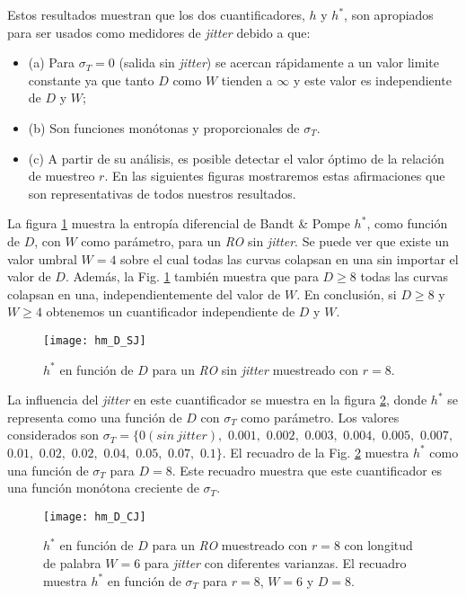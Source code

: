Estos resultados muestran que los dos cuantificadores, $h$ y $h^*$, son apropiados para ser usados como medidores de \textit{jitter} debido a que: 
\begin{itemize} 
\item (a) Para $\sigma_T=0$ (salida sin \textit{jitter}) se acercan rápidamente a un valor limite constante ya que tanto $D$ como $W$ tienden a $\infty$ y este valor es independiente de $D$ y $W$; 
\item (b) Son funciones monótonas y proporcionales de $\sigma_T$.
\item (c) A partir de su análisis, es posible detectar el valor óptimo de la relación de muestreo $r$.
En las siguientes figuras mostraremos estas afirmaciones que son representativas de todos nuestros resultados.
\end{itemize}
%
La figura \ref{fig:hm_D_SJ} muestra la entropía diferencial de Bandt \& Pompe $h^*$, como función de $D$, con $W$ como parámetro, para un \textit{RO} sin \textit{jitter}.
Se puede ver que existe un valor umbral $W = 4$ sobre el cual todas las curvas colapsan en una sin importar el valor de $D$.
Además, la Fig. \ref{fig:hm_D_SJ} también muestra que para $D \ge 8$ todas las curvas colapsan en una, independientemente del valor de $W$.
En conclusión, si $D \ge 8$ y $W \ge 4$ obtenemos un cuantificador independiente de $D$ y $W$.
%
\begin{figure}
	\centering
	\texttt{[image: hm\_D\_SJ]}
	\caption{$h^*$ en función de $D$ para un \emph{RO} sin \textit{jitter} muestreado con $r=8$.}
	\label{fig:hm_D_SJ}
\end{figure}

La influencia del \textit{jitter} en este cuantificador se muestra en la figura \ref{fig:hm_D_CJ}, donde $h^*$ se representa como una función de $D$ con $\sigma_T$ como parámetro.
Los valores considerados son $\sigma_T=\{0 (sin~jitter),$ $0.001,$ $0.002,$ $0.003,$ $0.004,$ $0.005,$ $0.007,$ $0.01,$ $0.02,$ $0.02,$ $0.04,$ $0.05,$ $0.07,$ $0.1\}$.
El recuadro de la Fig. \ref{fig:hm_D_CJ} muestra $h^*$ como una función de $\sigma_T$ para $D = 8$.
Este recuadro muestra que este cuantificador es una función monótona creciente de $\sigma_T$.
%
\begin{figure}
	\centering
	\texttt{[image: hm\_D\_CJ]}
	\caption{$h^*$ en función de $D$ para un \emph{RO} muestreado con $r=8$ con longitud de palabra $W=6$ para \textit{jitter} con diferentes varianzas. El recuadro muestra $h^*$ en función de $\sigma_T$ para $r=8$, $W=6$ y $D=8$.}
	\label{fig:hm_D_CJ}
\end{figure}

